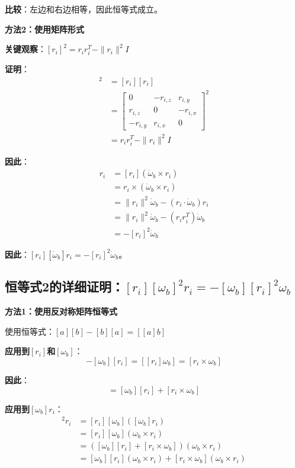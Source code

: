 \documentclass[12pt,a4paper]{article}
\begin{document}
\textbf{比较}：左边和右边相等，因此恒等式成立。

\textbf{方法2：使用矩阵形式}

\textbf{关键观察}：$[r_i]^2 = r_i r_i^T - \|r_i\|^2 I$

\textbf{证明}：
\begin{align}
[r_i]^2 &= [r_i][r_i] \\
&= \begin{bmatrix}
0 & -r_{i,z} & r_{i,y} \\
r_{i,z} & 0 & -r_{i,x} \\
-r_{i,y} & r_{i,x} & 0
\end{bmatrix}^2 \\
&= r_i r_i^T - \|r_i\|^2 I
\end{align}

\textbf{因此}：
\begin{align}
[r_i][\dot{\omega}_b] r_i &= [r_i](\dot{\omega}_b \times r_i) \\
&= r_i \times (\dot{\omega}_b \times r_i) \\
&= \|r_i\|^2 \dot{\omega}_b - (r_i \cdot \dot{\omega}_b) r_i \\
&= \|r_i\|^2 \dot{\omega}_b - (r_i r_i^T) \dot{\omega}_b \\
&= -[r_i]^2 \dot{\omega}_b
\end{align}

\textbf{因此}：$[r_i][\dot{\omega}_b] r_i = -[r_i]^2 \dot{\omega}_b$。

\subsection{恒等式2的详细证明：$[r_i][\omega_b]^2 r_i = -[\omega_b][r_i]^2 \omega_b$}

\textbf{方法1：使用反对称矩阵恒等式}

使用恒等式：$[a][b] - [b][a] = [[a]b]$

\textbf{应用到$[r_i]$和$[\omega_b]$}：
\begin{equation}
[r_i][\omega_b] - [\omega_b][r_i] = [[r_i]\omega_b] = [r_i \times \omega_b]
\end{equation}

\textbf{因此}：
\begin{equation}
[r_i][\omega_b] = [\omega_b][r_i] + [r_i \times \omega_b]
\end{equation}

\textbf{应用到$[\omega_b] r_i$}：
\begin{align}
[r_i][\omega_b]^2 r_i &= [r_i][\omega_b]([\omega_b] r_i) \\
&= [r_i][\omega_b](\omega_b \times r_i) \\
&= ([\omega_b][r_i] + [r_i \times \omega_b])(\omega_b \times r_i) \\
&= [\omega_b][r_i](\omega_b \times r_i) + [r_i \times \omega_b](\omega_b \times r_i)
\end{align}
\end{document}
